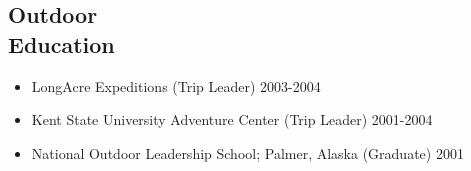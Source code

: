 \documentclass[margin,line,12pt]{res}
\begin{document}
\begin{resume}
\section{\sc Outdoor\\ Education}
\begin{itemize}
\item LongAcre Expeditions (Trip Leader) \hfill 2003-2004
\item Kent State University Adventure Center (Trip Leader) \hfill 2001-2004
\item National Outdoor Leadership School; Palmer, Alaska (Graduate) \hfill 2001
\end{itemize}



\end{resume}
\end{document}
